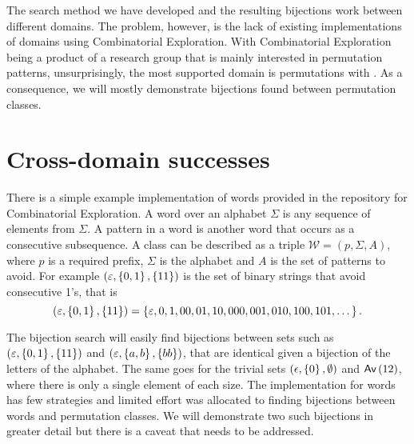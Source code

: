 \label{ch:results}

The search method we have developed and the resulting bijections work between different domains. The problem, however, is the lack of existing implementations of domains using Combinatorial Exploration. With Combinatorial Exploration being a product of a research group that is mainly interested in permutation patterns, unsurprisingly, the most supported domain is permutations with \tsc{}. As a consequence, we will mostly demonstrate bijections found between permutation classes.

\section{Cross-domain successes}
There is a simple example implementation of words provided in the repository for Combinatorial Exploration. A word over an alphabet $\Sigma$ is any sequence of elements from $\Sigma$. A pattern in a word is another word that occurs as a consecutive subsequence. A class can be described as a triple $\mathcal{W} = (p, \Sigma, A)$, where $p$ is a required prefix, $\Sigma$ is the alphabet and $A$ is the set of patterns to avoid. For example $(\varepsilon, \left\{0,1\right\}, \left\{11\right\})$ is the set of binary strings that avoid consecutive 1's, that is
\[
    (\varepsilon, \left\{0,1\right\}, \left\{11\right\}) = \left\{\varepsilon, 0, 1, 00, 01, 10, 000, 001, 010, 100, 101, \dotsc\right\}.
\]


The bijection search will easily find bijections between sets such as $(\varepsilon, \left\{0,1\right\}, \left\{11\right\})$ and $(\varepsilon, \left\{a,b\right\}, \left\{bb\right\})$, that are identical given a bijection of the letters of the alphabet. The same goes for the trivial sets $(\epsilon, \left\{0\right\}, \emptyset)$ and $\textsf{Av}\left(12\right)$, where there is only a single element of each size. The implementation for words has few strategies and limited effort was allocated to finding bijections between words and permutation classes. We will demonstrate two such bijections in greater detail but there is a caveat that needs to be addressed.

